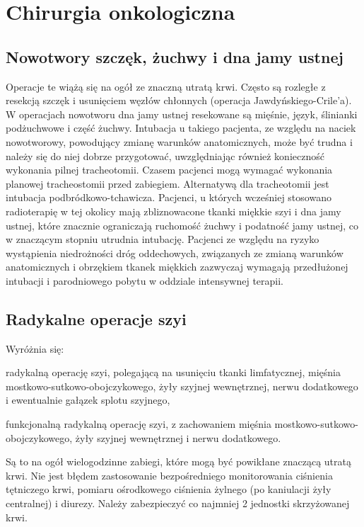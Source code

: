 \documentclass[a4paper, 12pt]{report}
\begin{document}
\section{Chirurgia onkologiczna}

\subsection{Nowotwory szczęk, żuchwy i dna jamy ustnej}

Operacje te wiążą się na ogół ze znaczną utratą krwi. Często są
rozległe z resekcją szczęk i usunięciem węzłów chłonnych (operacja
Jawdyńskiego-Crile'a). W operacjach nowotworu dna jamy
ustnej resekowane są mięśnie, język, ślinianki podżuchwowe i część
żuchwy. Intubacja u takiego pacjenta, ze względu na naciek
nowotworowy, powodujący zmianę warunków anatomicznych, może być trudna
i należy się do niej dobrze przygotować, uwzględniając również
konieczność wykonania pilnej tracheotomii. Czasem pacjenci mogą
wymagać wykonania planowej tracheostomii przed zabiegiem. Alternatywą
dla tracheotomii jest intubacja podbródkowo-tchawicza. Pacjenci, u
których wcześniej stosowano radioterapię w tej okolicy mają
zbliznowacone tkanki miękkie szyi i dna jamy ustnej, które znacznie
ograniczają ruchomość żuchwy i podatność jamy ustnej, co w znaczącym
stopniu utrudnia intubację.  Pacjenci ze względu na ryzyko wystąpienia
niedrożności dróg oddechowych, związanych ze zmianą warunków
anatomicznych i obrzękiem tkanek miękkich zazwyczaj wymagają
przedłużonej intubacji i parodniowego pobytu w oddziale intensywnej
terapii.

\subsection{Radykalne operacje szyi}

Wyróżnia się: 
\begin{inparaenum}
\item radykalną operację szyi, polegającą na usunięciu tkanki
limfatycznej, mięśnia mostkowo-sutkowo-obojczykowego, żyły szyjnej
wewnętrznej, nerwu dodatkowego i ewentualnie gałązek splotu szyjnego,
\item funkcjonalną radykalną operację szyi, z zachowaniem mięśnia
mostkowo-sutkowo-obojczykowego, żyły szyjnej wewnętrznej i nerwu
dodatkowego.
\end{inparaenum}

Są to na ogół wielogodzinne zabiegi, które mogą być powikłane znaczącą
utratą krwi. Nie jest błędem zastosowanie bezpośredniego monitorowania
ciśnienia tętniczego krwi, pomiaru ośrodkowego ciśnienia żylnego (po
kaniulacji żyły centralnej) i diurezy. Należy zabezpieczyć co najmniej
2 jednostki skrzyżowanej krwi. 
\end{document}
